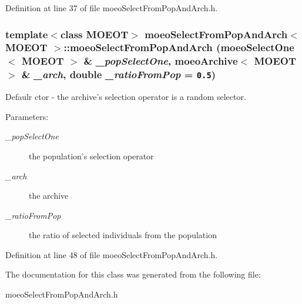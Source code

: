 Definition at line 37 of file moeo\-Select\-From\-Pop\-And\-Arch.h.
\subsubsection{\setlength{\rightskip}{0pt plus 5cm}template$<$class MOEOT$>$ \bf{moeo\-Select\-From\-Pop\-And\-Arch}$<$ MOEOT $>$::\bf{moeo\-Select\-From\-Pop\-And\-Arch} (\bf{moeo\-Select\-One}$<$ MOEOT $>$ \& {\em \_\-pop\-Select\-One}, \bf{moeo\-Archive}$<$ MOEOT $>$ \& {\em \_\-arch}, double {\em \_\-ratio\-From\-Pop} = {\tt 0.5})\hspace{0.3cm}{\tt  [inline]}}\label{classmoeoSelectFromPopAndArch_1c225b5f7b5a5ce6e87b46a7ea4a4cd0}


Defaulr ctor - the archive's selection operator is a random selector. 

\begin{Desc}
\item[Parameters:]
\begin{description}
\item[{\em \_\-pop\-Select\-One}]the population's selection operator \item[{\em \_\-arch}]the archive \item[{\em \_\-ratio\-From\-Pop}]the ratio of selected individuals from the population \end{description}
\end{Desc}


Definition at line 48 of file moeo\-Select\-From\-Pop\-And\-Arch.h.

The documentation for this class was generated from the following file:\begin{CompactItemize}
\item 
moeo\-Select\-From\-Pop\-And\-Arch.h\end{CompactItemize}
